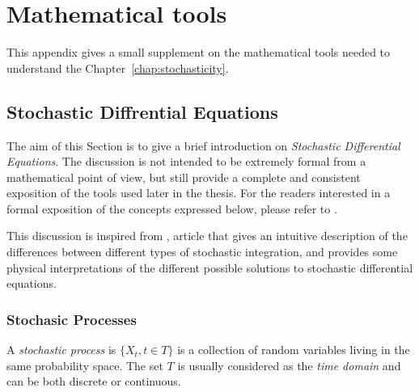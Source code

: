 \chapter{Mathematical tools} \label{app:math_tools}
This appendix gives a small supplement on the mathematical tools needed to understand the Chapter~\ref{chap:stochasticity}.

\section{Stochastic Diffrential Equations}
The aim of this Section is to give a brief introduction on \emph{Stochastic Differential Equations}.
The discussion is not intended to be extremely formal from a mathematical point of view,
but still provide a complete and consistent exposition of the tools used later in the thesis.
For the readers interested in a formal exposition of the concepts expressed below, please refer to \cite{morters2010brownian}.

This discussion is inspired from \cite{smith2018ito}, article that gives an intuitive description of the differences between different types of stochastic integration,
and provides some physical interpretations of the different possible solutions to stochastic differential equations.

\subsection{Stochasic Processes}
\begin{Definition}
  A \emph{stochastic process} is \(\{X_t, t\in T\}\) is a collection of random variables living in the same probability space.
  The set \(T\) is usually considered as the \emph{time domain} and can be both discrete or continuous.
\end{Definition}

